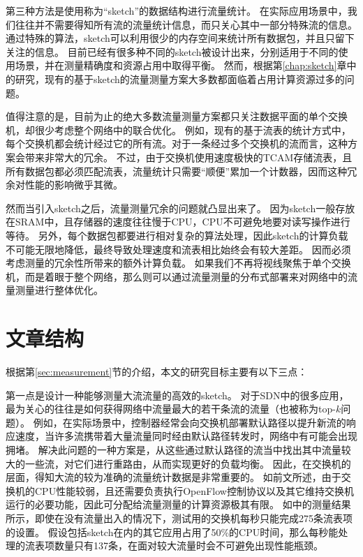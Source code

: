 第三种方法是使用称为“sketch”的数据结构进行流量统计。
在实际应用场景中，我们往往并不需要得知所有流的流量统计信息，而只关心其中一部分特殊流的信息。
通过特殊的算法，sketch可以利用很少的内存空间来统计所有数据包，并且只留下关注的信息。
目前已经有很多种不同的sketch被设计出来，分别适用于不同的使用场景，并在测量精确度和资源占用中取得平衡\cite{KXW06}\cite{li2012per}\cite{estan2002new}。
然而，根据第\ref{chap:sketch}章中的研究，现有的基于sketch的流量测量方案大多数都面临着占用计算资源过多的问题。

值得注意的是，目前为止的绝大多数流量测量方案都只关注数据平面的单个交换机，却很少考虑整个网络中的联合优化。
例如，现有的基于流表的统计方式中，每个交换机都会统计经过它的所有流。对于一条经过多个交换机的流而言，这种方案会带来非常大的冗余。
不过，由于交换机使用速度极快的TCAM存储流表，且所有数据包都必须匹配流表，流量统计只需要“顺便”累加一个计数器，因而这种冗余对性能的影响微乎其微。

然而当引入sketch之后，流量测量冗余的问题就凸显出来了。
因为sketch一般存放在SRAM中，且存储器的速度往往慢于CPU，CPU不可避免地要对读写操作进行等待。
另外，每个数据包都要进行相对复杂的算法处理，因此sketch的计算负载不可能无限地降低，最终导致处理速度和流表相比始终会有较大差距。
因而必须考虑测量的冗余性所带来的额外计算负载。
如果我们不再将视线聚焦于单个交换机，而是着眼于整个网络，那么则可以通过流量测量的分布式部署来对网络中的流量测量进行整体优化。

\section{文章结构}
根据第\ref{sec:measurement}节的介绍，本文的研究目标主要有以下三点：

第一点是设计一种能够测量大流流量的高效的sketch。
对于SDN中的很多应用，最为关心的往往是如何获得网络中流量最大的若干条流的流量（也被称为top-$k$问题）。
例如，在实际场景中，控制器经常会向交换机部署默认路径以提升新流的响应速度，当许多流携带着大量流量同时经由默认路径转发时，网络中有可能会出现拥堵。
解决此问题的一种方案是，从这些通过默认路径的流当中找出其中流量较大的一些流，对它们进行重路由，从而实现更好的负载均衡。
因此，在交换机的层面，得知大流的较为准确的流量统计数据是非常重要的。
如前文所述，由于交换机的CPU性能较弱，且还需要负责执行OpenFlow控制协议以及其它维持交换机运行的必要功能，因此可分配给流量测量的计算资源极其有限。
如\cite{curtis2011devoflow}中的测量结果所示，即使在没有流量出入的情况下，测试用的交换机每秒只能完成275条流表项的设置。
假设包括sketch在内的其它应用占用了50\%的CPU时间，那么每秒能处理的流表项数量只有137条，在面对较大流量时会不可避免出现性能瓶颈。

